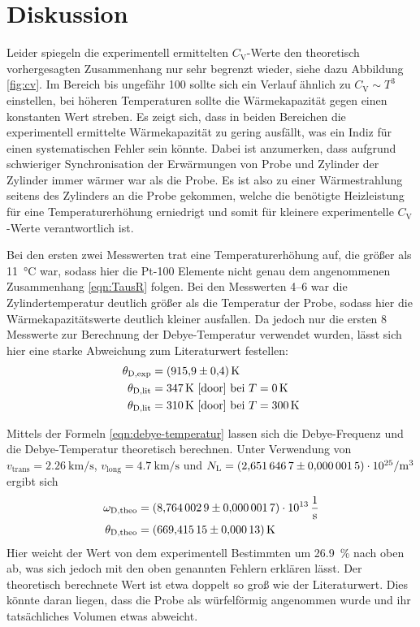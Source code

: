 \section{Diskussion}
\label{sec:Diskussion}

Leider spiegeln die experimentell ermittelten $C_\text{V}$-Werte den
theoretisch vorhergesagten Zusammenhang nur sehr begrenzt wieder, siehe
dazu Abbildung \ref{fig:cv}. Im Bereich bis ungefähr \SI{100}{\grd} sollte sich
ein Verlauf ähnlich zu $C_\text{V} \sim T^3$ einstellen, bei höheren
Temperaturen sollte die Wärmekapazität gegen einen konstanten Wert
streben. Es zeigt sich, dass in beiden Bereichen die experimentell
ermittelte Wärmekapazität zu gering ausfällt, was ein Indiz für einen
systematischen Fehler sein könnte. Dabei ist anzumerken, dass aufgrund
schwieriger Synchronisation der Erwärmungen von Probe und Zylinder
der Zylinder immer wärmer war als die Probe. Es ist also zu einer
Wärmestrahlung seitens des Zylinders an die Probe gekommen, welche die benötigte
Heizleistung für eine Temperaturerhöhung erniedrigt und somit für kleinere
experimentelle $C_\text{V}$-Werte verantwortlich ist.

Bei den ersten zwei Messwerten trat eine Temperaturerhöhung auf, die
größer als \SI{11}{\celsius} war, sodass hier die Pt-100 Elemente nicht
genau dem angenommenen Zusammenhang \eqref{eqn:TausR} folgen. Bei den Messwerten
\numrange{4}{6} war die Zylindertemperatur deutlich größer als die
Temperatur der Probe, sodass hier die Wärmekapazitätswerte deutlich kleiner
ausfallen. Da jedoch nur die ersten \num{8} Messwerte zur Berechnung der
Debye-Temperatur verwendet wurden, lässt sich hier eine starke Abweichung
zum Literaturwert festellen:
\begin{align*}
    \theta_\text{D,exp} &= \SI{915.9(4)}{\kelvin} \\
    \theta_\text{D,lit} &= \SI{347}{\kelvin} \text{ \cite{door} bei }T = \SI{0}{\kelvin} \\
    \theta_\text{D,lit} &= \SI{310}{\kelvin} \text{ \cite{door} bei }T = \SI{300}{\kelvin}
\end{align*}

Mittels der Formeln \eqref{eqn:debye-temperatur} %
lassen sich die Debye-Frequenz und die Debye-Temperatur theoretisch
berechnen. Unter Verwendung von
$v_\text{trans}=\SI{2.26}{\kilo\meter\per\second}$,
$v_\text{long}=\SI{4.7}{\kilo\meter\per\second}$ \cite[p.~5]{anleitung}
und $N_\text{L}=\SI{2.6516467(15)e25}{\raiseto{-3}\meter}$ \cite{Codata}
ergibt sich
\begin{align*}
    \omega_\text{D,theo} &= \SI{8.7640029(17)e+13}{\raiseto{-1}\second} \\
    \theta_\text{D,theo} &= \SI{669.41515(13)}{\kelvin}
\end{align*}
Hier weicht der Wert von dem experimentell Bestimmten um \SI{26.9}{\percent}
nach oben ab, was sich jedoch mit den oben genannten Fehlern erklären lässt.
Der theoretisch berechnete Wert ist etwa doppelt so groß wie der Literaturwert.
Dies könnte daran liegen, dass die Probe als würfelförmig angenommen wurde und
ihr tatsächliches Volumen etwas abweicht.

